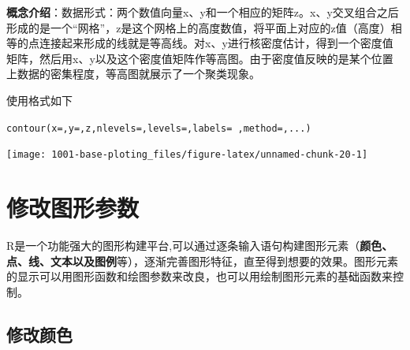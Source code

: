 \documentclass[
]{book}
\newenvironment{Shaded}{\begin{snugshade}}{\end{snugshade}}
\newcommand{\AttributeTok}[1]{\textcolor[rgb]{0.77,0.63,0.00}{#1}}
\newcommand{\CommentTok}[1]{\textcolor[rgb]{0.56,0.35,0.01}{\textit{#1}}}
\newcommand{\DecValTok}[1]{\textcolor[rgb]{0.00,0.00,0.81}{#1}}
\newcommand{\FunctionTok}[1]{\textcolor[rgb]{0.00,0.00,0.00}{#1}}
\newcommand{\NormalTok}[1]{#1}
\newcommand{\OtherTok}[1]{\textcolor[rgb]{0.56,0.35,0.01}{#1}}
\newcommand{\SpecialCharTok}[1]{\textcolor[rgb]{0.00,0.00,0.00}{#1}}
\newcommand{\StringTok}[1]{\textcolor[rgb]{0.31,0.60,0.02}{#1}}
\begin{document}
\textbf{概念介绍}：数据形式：两个数值向量x、y和一个相应的矩阵z。x、y交叉组合之后形成的是一个``网格''，z是这个网格上的高度数值，将平面上对应的z值（高度）相等的点连接起来形成的线就是等高线。对x、y进行核密度估计，得到一个密度值矩阵，然后用x、y以及这个密度值矩阵作等高图。由于密度值反映的是某个位置上数据的密集程度，等高图就展示了一个聚类现象。

使用格式如下

\texttt{contour(x=,y=,z,nlevels=,levels=,labels=\ ,method=,...)}

\begin{Shaded}
\end{Shaded}

\begin{center}\texttt{[image: 1001-base-ploting\_files/figure-latex/unnamed-chunk-20-1]} \end{center}

\hypertarget{ux4feeux6539ux56feux5f62ux53c2ux6570}{%
\section{修改图形参数}\label{ux4feeux6539ux56feux5f62ux53c2ux6570}}

R是一个功能强大的图形构建平台,可以通过逐条输入语句构建图形元素（\textbf{颜色、点、线、文本以及图例}等），逐渐完善图形特征，直至得到想要的效果。图形元素的显示可以用图形函数和绘图参数来改良，也可以用绘制图形元素的基础函数来控制。

\hypertarget{ux4feeux6539ux989cux8272}{%
\subsection{修改颜色}\label{ux4feeux6539ux989cux8272}}
\end{document}
